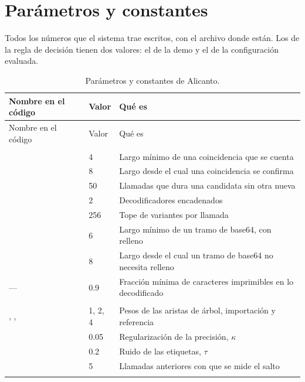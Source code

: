 \section{Parámetros y constantes}\label{ap:parametros}

Todos los números que el sistema trae escritos, con el archivo donde están. Los de la regla de decisión
tienen dos valores: el de la demo y el de la configuración evaluada.

\begin{small}
\begin{longtable}{@{}P{4.3cm}P{2.5cm}P{8.0cm}@{}}
\caption{Parámetros y constantes de Alicanto.}\label{tab:constantes}\\
\toprule
Nombre en el código & Valor & Qué es \\
\midrule
\endfirsthead
\toprule
Nombre en el código & Valor & Qué es \\
\midrule
\endhead
\bottomrule
\endfoot
{} \\
 & 4 & Largo mínimo de una coincidencia que se cuenta \\
 & 8 & Largo desde el cual una coincidencia se confirma \\
 & 50 & Llamadas que dura una candidata sin otra nueva \\
 & 2 & Decodificadores encadenados \\
 & 256 & Tope de variantes por llamada \\
 & 6 & Largo mínimo de un tramo de base64, con relleno \\
 & 8 & Largo desde el cual un tramo de base64 no necesita relleno \\
--- & \num{0.9} & Fracción mínima de caracteres imprimibles en lo decodificado \\
\addlinespace
{} \\
, ,  & 1, 2, 4 & Pesos de las aristas de árbol, importación y
  referencia \\
 & \num{0.05} & Regularización de la precisión, $\kappa$ \\
 & \num{0.2} & Ruido de las etiquetas, $\tau$ \\
 & 5 & Llamadas anteriores con que se mide el salto \\
\addlinespace
{} \\

\end{longtable}
\end{small}
